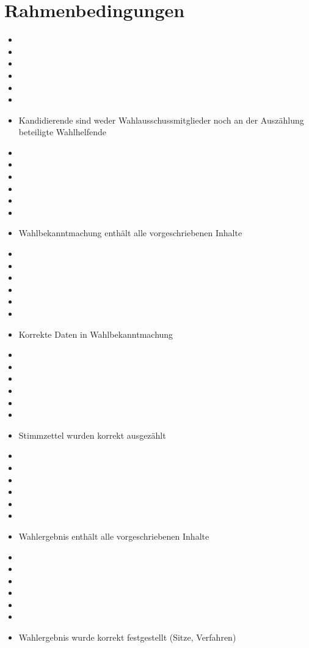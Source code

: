 \documentclass[a4paper]{scrartcl}
\newcommand{\fullcheck}{\raisebox{-.8\dp\strutbox}{\texttt{[image: Check.pdf]}}}
\newcommand{\semicheck}{\raisebox{-.8\dp\strutbox}{\texttt{[image: Semicheck.pdf]}}}
\newcommand{\nocheck}{\raisebox{-.8\dp\strutbox}{\texttt{[image: Nocheck.pdf]}}}
\newcommand{\dontknow}{\raisebox{-.8\dp\strutbox}{\texttt{[image: Dontknow.pdf]}}}
\newcommand{\notrev}{\raisebox{-.8\dp\strutbox}{\texttt{[image: Notrev.pdf]}}}
\newcommand{\sym}[1]{
\ifcase#1 \item[$\Box$]
\or \item[\fullcheck]
\or \item[\semicheck]
\or \item[\nocheck]
\or \item[\dontknow]
\or \item[\notrev]
\else \item[$\Box$]
\fi}
\begin{document}


\section{Rahmenbedingungen}
\begin{itemize}[label=$\Box$]

\sym{1} Kandidierende sind weder Wahlausschussmitglieder noch an der Auszählung beteiligte Wahlhelfende
\sym{1} Wahlbekanntmachung enthält alle vorgeschriebenen Inhalte
\sym{1} Korrekte Daten in Wahlbekanntmachung
\sym{1} Stimmzettel wurden korrekt ausgezählt
\sym{1} Wahlergebnis enthält alle vorgeschriebenen Inhalte
\sym{1} Wahlergebnis wurde korrekt festgestellt (Sitze, Verfahren)
\end{itemize}








\end{document}

